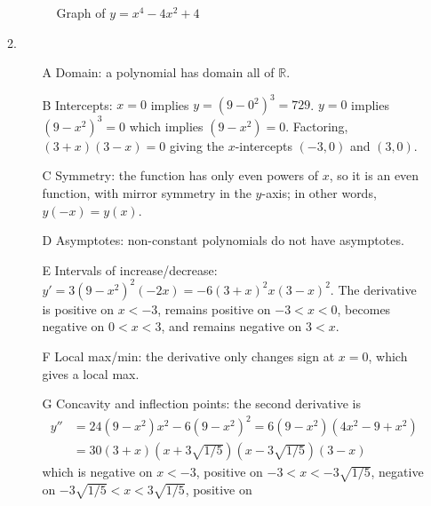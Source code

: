 \documentclass{article}
\begin{document}
\begin{enumerate}
\begin{enumerate}
\begin{figure}[htbp]
      \caption{Graph of $y=x^4-4x^2+4$}
      \label{fig:x4-4x2+4}
    \end{figure}
  \item %
    \begin{itemize}
    \item[A] Domain: a polynomial has domain all of $\mathbb{R}$.
    \item[B] Intercepts: $x=0$ implies $y=(9-0^2)^3=729$.  $y=0$
      implies $(9-x^2)^3=0$ which implies $(9-x^2)=0$.  Factoring,
      $(3+x)(3-x)=0$ giving the $x$-intercepts $(-3,0)$ and $(3,0)$.
    \item[C] Symmetry: the function has only even powers of $x$, so it
      is an even function, with mirror symmetry in the $y$-axis; in
      other words, $y(-x)=y(x)$.
    \item[D] Asymptotes: non-constant polynomials do not have
      asymptotes.
    \item[E] Intervals of increase/decrease:
      $y'=3(9-x^2)^2(-2x)=-6(3+x)^2x(3-x)^2$.  The derivative is
      positive on $x<-3$, remains positive on $-3<x<0$, becomes
      negative on $0<x<3$, and remains negative on $3<x$.
    \item[F] Local max/min: the derivative only changes sign at $x=0$,
      which gives a local max.
    \item[G] Concavity and inflection points: the second derivative is
      \begin{align*}
        y'' &= 24(9-x^2)x^2-6(9-x^2)^2 = 6(9-x^2)(4x^2-9+x^2) \\
        &= 30(3+x)(x+3\sqrt{1/5})(x-3\sqrt{1/5})(3-x)
      \end{align*}
      which is negative on $x<-3$, positive on $-3<x<-3\sqrt{1/5}$,
      negative on $-3\sqrt{1/5}<x<3\sqrt{1/5}$, positive on

\end{itemize}
\end{enumerate}
\end{enumerate}
\end{document}
